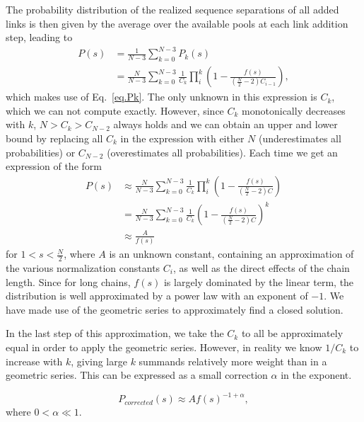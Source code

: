 \documentclass[
reprint,
twocolumn,
amsmath,amssymb,superscriptaddress,aps,
pre]{revtex4-1}
\begin{document}
The probability distribution of the realized sequence separations of all added links is then given by the average over the available pools at each link addition step, leading to
\begin{align}
    P(s)&=\frac{1}{N-3}\sum_{k=0}^{N-3} P_k(s) \nonumber \\
    &= \frac{N}{N-3}\sum_{k=0}^{N-3} \frac{1}{C_k}\prod_{i}^k\left(1-\frac{f(s)}{(\frac{N}{2}-2)C_{i-1}} \right),
\end{align}
which makes use of Eq.~\ref{eq.Pk}. The only unknown in this expression is $C_k$, which we can not compute exactly. However, since $C_k$ monotonically decreases with $k$, $N>C_k>C_{N-2}$ always holds and we can obtain an upper and lower bound by replacing all $C_k$ in the expression with either $N$ (underestimates all probabilities) or $C_{N-2}$ (overestimates all probabilities). Each time we get an expression of the form 
\begin{align}
     P(s)&\approx\frac{N}{N-3}\sum_{k=0}^{N-3} \frac{1}{C_k}\prod_{i}^k\left(1-\frac{f(s)}{(\frac{N}{2}-2)C} \right)\nonumber \\
     &=\frac{N}{N-3} \sum_{k=0}^{N-3}\frac{1}{C_k}\left(1-\frac{f(s)}{(\frac{N}{2}-2)C} \right)^k \nonumber \\
     &\approx \frac{A}{f(s)}
\end{align}
for $1<s<\frac{N}{2}$,
where $A$ is an unknown constant, containing an approximation of the various normalization constants $C_i$, as well as the direct effects of the chain length. 
Since for long chains, $f(s)$ is largely dominated by the linear term, the distribution is well approximated by a power law with an exponent of $-1$. We have made use of the geometric series to approximately find a closed solution. 

In the last step of this approximation, we take the $C_k$ to all be approximately equal in order to apply the geometric series. However, in reality we know $1/C_k$ to increase with $k$, giving large $k$ summands relatively more weight than in a geometric series. This can be expressed as a small correction $\alpha$ in the exponent.

\begin{equation}
    P_{corrected}(s)\approx A f(s)^{-1+\alpha},
\end{equation}
where $0<\alpha \ll 1$.
\end{document}
